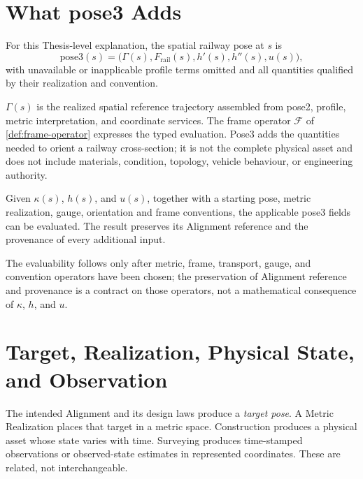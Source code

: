 \section{What pose3 Adds}

\begin{definition}
\label{def:runtime-pose3}
For this Thesis-level explanation, the spatial railway pose at \(s\) is
\begin{equation}
\mathrm{pose3}(s)=
\bigl(\Gamma(s),F_{\mathrm{rail}}(s),
h'(s),h''(s),u(s)\bigr),
\label{eq:runtime-pose3}
\end{equation}
with unavailable or inapplicable profile terms omitted and all quantities
qualified by their realization and convention.
\end{definition}

\(\Gamma(s)\) is the realized spatial reference trajectory assembled from
pose2, profile, metric interpretation, and coordinate services. The frame
operator \(\mathcal F\) of \cref{def:frame-operator} expresses the typed
evaluation. Pose3 adds the quantities needed to orient a railway
cross-section; it is not the complete physical asset and does not include
materials, condition, topology, vehicle behaviour, or engineering authority.

\begin{principle}
\label{prop:pose3-reconstruction}
Given \(\kappa(s)\), \(h(s)\), and \(u(s)\), together with a starting pose,
metric realization, gauge, orientation and frame conventions, the applicable
pose3 fields can be evaluated. The result preserves its Alignment reference
and the provenance of every additional input.
\end{principle}

The evaluability follows only after metric, frame, transport, gauge, and
convention operators have been chosen; the preservation of Alignment
reference and provenance is a contract on those operators, not a
mathematical consequence of \(\kappa\), \(h\), and \(u\).

\section{Target, Realization, Physical State, and Observation}

The intended Alignment and its design laws produce a \emph{target pose}.
A Metric Realization places that target in a metric space. Construction
produces a physical asset whose state varies with time. Surveying produces
time-stamped observations or observed-state estimates in represented
coordinates. These are related, not interchangeable.

